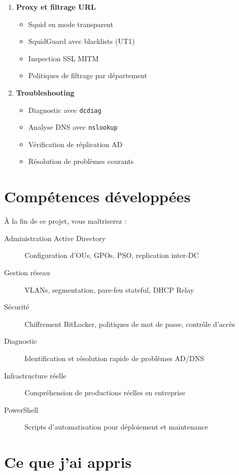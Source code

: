 \begin{enumerate}
    \item \textbf{Proxy et filtrage URL}
    \begin{itemize}
        \item Squid en mode transparent
        \item SquidGuard avec blacklists (UT1)
        \item Inspection SSL MITM
        \item Politiques de filtrage par département
    \end{itemize}

    \item \textbf{Troubleshooting}
    \begin{itemize}
        \item Diagnostic avec \texttt{dcdiag}
        \item Analyse DNS avec \texttt{nslookup}
        \item Vérification de réplication AD
        \item Résolution de problèmes courants
    \end{itemize}
\end{enumerate}

\section{Compétences développées}

À la fin de ce projet, vous maîtriserez :

\begin{description}
    \item[Administration Active Directory] Configuration d'OUs, GPOs, PSO, replication inter-DC
    \item[Gestion réseau] VLANs, segmentation, pare-feu stateful, DHCP Relay
    \item[Sécurité] Chiffrement BitLocker, politiques de mot de passe, contrôle d'accès
    \item[Diagnostic] Identification et résolution rapide de problèmes AD/DNS
    \item[Infrastructure réelle] Compréhension de productions réelles en entreprise
    \item[PowerShell] Scripts d'automatisation pour déploiement et maintenance
\end{description}

\section{Ce que j'ai appris}

